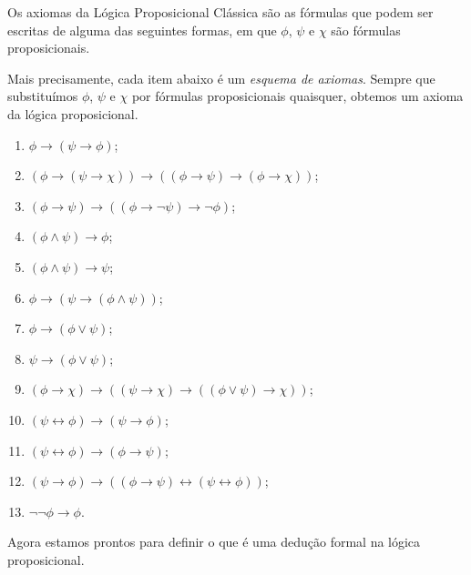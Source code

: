 \begin{metadefinition}\label{mdef:axiomasLogicaProposicional}
    Os axiomas da Lógica Proposicional Clássica são as fórmulas que podem ser escritas de alguma das seguintes formas, em que $\phi$, $\psi$ e $\chi$ são fórmulas proposicionais.

    Mais precisamente, cada item abaixo é um \emph{esquema de axiomas}.
    Sempre que substituímos $\phi$, $\psi$ e $\chi$ por fórmulas proposicionais quaisquer, obtemos um axioma da lógica proposicional.

    \begin{enumerate}[label=(PC\arabic*)]
        \item $\phi \rightarrow (\psi \rightarrow \phi)$;
        \item $(\phi \rightarrow (\psi \rightarrow \chi)) \rightarrow ((\phi \rightarrow \psi) \rightarrow (\phi \rightarrow \chi))$;
        \item $(\phi \rightarrow \psi) \rightarrow ((\phi \rightarrow \neg \psi) \rightarrow \neg \phi)$;
        \item $(\phi \land \psi) \rightarrow \phi$;
        \item $(\phi \land \psi) \rightarrow \psi$;
        \item $\phi \rightarrow (\psi \rightarrow (\phi \land \psi))$;
        \item $\phi \rightarrow (\phi \lor \psi)$;
        \item $\psi \rightarrow (\phi \lor \psi)$;
        \item $(\phi \rightarrow \chi) \rightarrow ((\psi \rightarrow \chi) \rightarrow ((\phi \lor \psi) \rightarrow \chi))$;
        \item $(\psi \leftrightarrow \phi) \rightarrow (\psi \rightarrow \phi)$;
        \item $(\psi \leftrightarrow \phi) \rightarrow (\phi \rightarrow \psi)$;
        \item $(\psi \rightarrow \phi) \rightarrow ((\phi \rightarrow \psi) \leftrightarrow (\psi \leftrightarrow \phi))$;
        \item $\neg \neg \phi \rightarrow \phi$.
    \end{enumerate}
\end{metadefinition}


Agora estamos prontos para definir o que é uma dedução formal na lógica proposicional.

